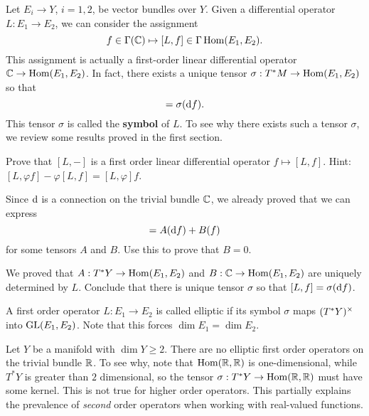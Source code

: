 \begin{defn}
  Let $E_{i}\to Y$, $i=1,2$, be vector bundles over $Y$. Given a differential operator $L:E_{1}\to E_{2}$, we can consider the assignment
  \begin{equation*}
    f\in \Gamma(\mathbb{C})\mapsto [L,f]\in \Gamma\operatorname{\mathrm{Hom}}(E_{1},E_{2}).
  \end{equation*}
  This assignment is actually a first-order linear differential operator $\mathbb{C}\to \operatorname{\mathrm{Hom}}(E_{1},E_{2})$. In fact, there exists a unique tensor $\sigma:T^{*}M\to \operatorname{\mathrm{Hom}}(E_{1},E_{2})$ so that
  \begin{equation*}
    [L,f]=\sigma(\d f).
  \end{equation*}
  This tensor $\sigma$ is called the \textbf{symbol} of $L$. To see why there exists such a tensor $\sigma$, we review some results proved in the first section.

  \begin{xca}
    Prove that $[L,-]$ is a first order linear differential operator $f\mapsto [L,f]$. Hint: $[L,\varphi f]-\varphi[L,f]=[L,\varphi]f$.    
  \end{xca}
  \begin{xca}
    Since $\mathrm{d}$ is a connection on the trivial bundle $\mathbb{C}$, we already proved that we can express
    \begin{equation*}
      [L,f]=A(\d f)+B(f)
    \end{equation*}
    for some tensors $A$ and $B$. Use this to prove that $B=0$.

    We proved that $A:T^{*}Y\to \operatorname{\mathrm{Hom}}(E_{1},E_{2})$ and $B:\mathbb{C}\to \operatorname{\mathrm{Hom}}(E_{1},E_{2})$ are uniquely determined by $L$. Conclude that there is unique tensor $\sigma$ so that $[L,f]=\sigma(\mathrm{d} f)$.
  \end{xca}
  \end{defn}
  \begin{defn}
    A first order operator $L:E_{1}\to E_{2}$ is called elliptic if its symbol $\sigma$ maps $(T^{*}Y)^{\times}$ into $\mathrm{GL}(E_{1},E_{2})$. Note that this forces $\dim E_{1}=\dim E_{2}$.    
  \end{defn}
  \begin{example}
    Let $Y$ be a manifold with $\dim Y\ge 2$. There are no elliptic first order operators on the trivial bundle $\mathbb{R}$. To see why, note that $\operatorname{\mathrm{Hom}}(\mathbb{R},\mathbb{R})$ is one-dimensional, while $T^{*}Y$ is greater than $2$ dimensional, so the tensor $\sigma:T^{*}Y\to \operatorname{\mathrm{Hom}}(\mathbb{R},\mathbb{R})$ must have some kernel. This is not true for higher order operators. This partially explains the prevalence of \emph{second} order operators when working with real-valued functions.
  \end{example}
